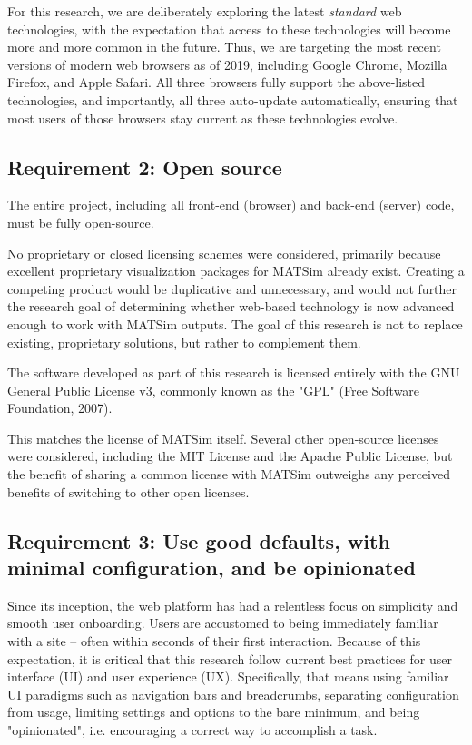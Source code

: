 \documentclass[Afour,sageh,times]{sagej}
\begin{document}
For this research, we are deliberately exploring the latest \textit{standard} web technologies, with the expectation that access to these technologies will become more and more common in the future. Thus, we are targeting the most recent versions of modern web browsers as of 2019, including Google Chrome, Mozilla Firefox,
and Apple Safari. All three browsers fully support the above-listed technologies, and importantly, all three auto-update automatically, ensuring that most users of those browsers stay current as these technologies evolve.

\subsection{Requirement 2: Open source}

The entire project, including all front-end (browser) and back-end (server) code, must be fully open-source.

No proprietary or closed licensing schemes were considered, primarily because excellent proprietary visualization packages for MATSim already exist. Creating a competing product would be duplicative and unnecessary, and would not further the research goal of determining whether web-based technology is now advanced enough to work with MATSim outputs. The goal of this research is not to replace existing, proprietary solutions, but rather to complement them.

The software developed as part of this research is licensed entirely with the GNU General Public License v3, commonly known as the "GPL" (Free Software Foundation, 2007).

This matches the license of MATSim itself. Several other open-source licenses were considered, including the MIT License and the Apache Public License, but the benefit of sharing a common license with MATSim outweighs any perceived benefits of switching to other open licenses.

\subsection{Requirement 3: Use good defaults, with minimal configuration, and be opinionated}

Since its inception, the web platform has had a relentless focus on simplicity and smooth user onboarding. Users are accustomed to being immediately familiar with a site -- often within seconds of their first interaction. Because of this expectation, it is critical that this research follow current best practices
for user interface (UI) and user experience (UX). Specifically, that means using familiar UI paradigms such as navigation bars and breadcrumbs, separating configuration from usage, limiting settings and options to the bare minimum, and being "opinionated", i.e. encouraging a correct way to accomplish a task.
\end{document}
